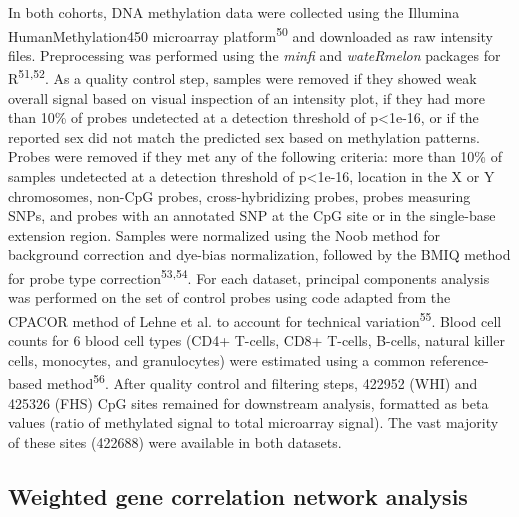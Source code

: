 \documentclass[]{article}
\theoremstyle{definition}
\theoremstyle{definition}
\theoremstyle{definition}
\theoremstyle{remark}
\begin{document}
In both cohorts, DNA methylation data were collected using the Illumina
HumanMethylation450 microarray platform\textsuperscript{50} and
downloaded as raw intensity files. Preprocessing was performed using the
\emph{minfi} and \emph{wateRmelon} packages for
R\textsuperscript{51,52}. As a quality control step, samples were
removed if they showed weak overall signal based on visual inspection of
an intensity plot, if they had more than 10\% of probes undetected at a
detection threshold of p\textless{}1e-16, or if the reported sex did not
match the predicted sex based on methylation patterns. Probes were
removed if they met any of the following criteria: more than 10\% of
samples undetected at a detection threshold of p\textless{}1e-16,
location in the X or Y chromosomes, non-CpG probes, cross-hybridizing
probes, probes measuring SNPs, and probes with an annotated SNP at the
CpG site or in the single-base extension region. Samples were normalized
using the Noob method for background correction and dye-bias
normalization, followed by the BMIQ method for probe type
correction\textsuperscript{53,54}. For each dataset, principal
components analysis was performed on the set of control probes using
code adapted from the CPACOR method of Lehne et al. to account for
technical variation\textsuperscript{55}. Blood cell counts for 6 blood
cell types (CD4+ T-cells, CD8+ T-cells, B-cells, natural killer cells,
monocytes, and granulocytes) were estimated using a common
reference-based method\textsuperscript{56}. After quality control and
filtering steps, 422952 (WHI) and 425326 (FHS) CpG sites remained for
downstream analysis, formatted as beta values (ratio of methylated
signal to total microarray signal). The vast majority of these sites
(422688) were available in both datasets.

\subsection{Weighted gene correlation network
analysis}\label{weighted-gene-correlation-network-analysis}
\end{document}
